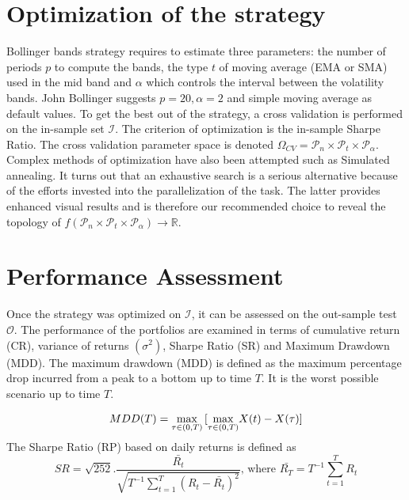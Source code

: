 \documentclass[11pt,a4,twosided,singlespacing,titlepagenumber=on]{scrreprt}
\numberwithin{equation}{chapter} %
\theoremstyle{remark}
\begin{document}
\section{Optimization of the strategy}
\label{sec:optimization_strategy}
Bollinger bands strategy requires to estimate three parameters: the number of periods $p$ to compute the bands, the type $t$ of moving average (EMA or SMA) used in the mid band and $\alpha$ which controls the interval between the volatility bands. John Bollinger suggests $p = 20, \alpha = 2$ and simple moving average as default values. To get the best out of the strategy, a cross validation is performed on the in-sample set $\mathcal{I}$. The criterion of optimization is the in-sample Sharpe Ratio. The cross validation parameter space is denoted  $\Omega_{CV} = \mathcal{P}_n \times \mathcal{P}_t \times \mathcal{P}_\alpha$. Complex methods of optimization have also been attempted such as Simulated annealing. It turns out that an exhaustive search is a serious alternative because of the efforts invested into the parallelization of the task. The latter provides enhanced visual results and is therefore our recommended choice to reveal the topology of $f(\mathcal{P}_n \times \mathcal{P}_t \times \mathcal{P}_\alpha) \rightarrow \mathbb{R}$.
 
\section{Performance Assessment}
Once the strategy was optimized on $\mathcal{I}$, it can be assessed on the out-sample test $\mathcal{O}$. The performance of the portfolios are examined in terms of cumulative return (CR), variance of returns $(\sigma^2)$, Sharpe Ratio (SR) and Maximum Drawdown (MDD). The maximum drawdown (MDD) is defined as the maximum percentage drop incurred from a peak to a bottom up to time $T$. It is the worst possible scenario up to time $T$.

\begin{equation}
MDD(T) = \smash{\displaystyle\max_{\tau \in (0,T)}} \left[\smash{\displaystyle\max_{\tau \in (0,T)}} X(t) - X(\tau) \right] 
\end{equation}

The Sharpe Ratio (RP) based on daily returns is defined as
\begin{equation}
SR =  \sqrt{252 }  . \frac{\bar{R_t}}{\sqrt{T^{-1} \sum_{t=1}^T (R_t - \bar{R_t})^2 }} \text{, where } \bar{R_T} = T^{-1} \sum_{t=1}^T R_t \label{sharpe_ratio_def}
\end{equation}
\end{document}
